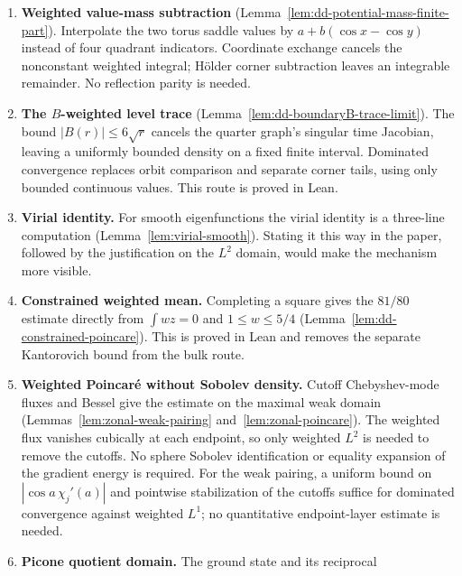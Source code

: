 \begin{enumerate}
        $|u|^2$ supplies exponential arc tails and the $L(h)h^{1/4}$ integrated
        orbit error directly. Local forcing charts are unnecessary.
        The leading period asymptotic is needed only for the final $\log8$.
  \item \textbf{Weighted value-mass subtraction}
        (Lemma~\ref{lem:dd-potential-mass-finite-part}). Interpolate the two
        torus saddle values by $a+b(\cos x-\cos y)$ instead of four quadrant
        indicators. Coordinate exchange cancels the nonconstant weighted
        integral; H\"older corner subtraction leaves an integrable remainder.
        No reflection parity is needed.
  \item \textbf{The $B$-weighted level trace}
        (Lemma~\ref{lem:dd-boundaryB-trace-limit}). The bound
        $|B(r)|\le6\sqrt r$ cancels the quarter graph's singular time Jacobian,
        leaving a uniformly bounded density on a fixed finite interval.
        Dominated convergence replaces orbit comparison and separate corner
        tails, using only bounded continuous values. This route is proved in Lean.
  \item \textbf{Virial identity.} For smooth eigenfunctions the virial identity
        is a three-line computation (Lemma~\ref{lem:virial-smooth}). Stating
        it this way in the paper, followed by the justification on the $L^2$
        domain, would make the mechanism more visible.
  \item \textbf{Constrained weighted mean.} Completing a square gives the
        $81/80$ estimate directly from $\int wz=0$ and $1\le w\le5/4$
        (Lemma~\ref{lem:dd-constrained-poincare}). This is proved in Lean
        and removes the separate Kantorovich bound from the bulk route.
  \item \textbf{Weighted Poincar\'e without Sobolev density.}
        Cutoff Chebyshev-mode fluxes and Bessel give the estimate on the maximal
        weak domain (Lemmas~\ref{lem:zonal-weak-pairing} and~\ref{lem:zonal-poincare}).
        The weighted flux vanishes cubically at each endpoint, so only weighted
        $L^2$ is needed to remove the cutoffs. No sphere Sobolev identification
        or equality expansion of the gradient energy is required. For the weak
        pairing, a uniform bound on $|\cos a\,\chi_j'(a)|$ and pointwise
        stabilization of the cutoffs suffice for dominated convergence against
        weighted $L^1$; no quantitative endpoint-layer estimate is needed.
  \item \textbf{Picone quotient domain.} The ground state and its reciprocal

\end{enumerate}
